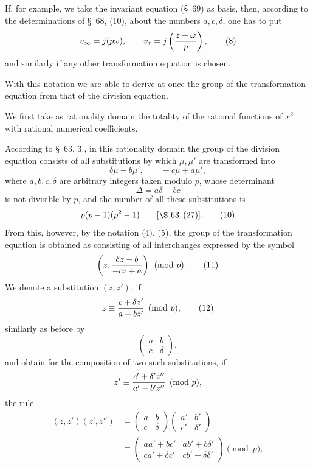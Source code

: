 \documentclass[11pt]{article}
\begin{document}
If, for example, we take the invariant equation (\S~69) as basis, then, according to the determinations of \S~68, (10), about the numbers $a,c,\delta$, one has to put
\begin{equation}
 v_\infty=j(p\omega),
 \qquad
 v_z=j\left({z+\omega\over p}\right),
\tag{8}
\end{equation}
and similarly if any other transformation equation is chosen.

With this notation we are able to derive at once the group of the transformation equation from that of the division equation.

We first take as rationality domain the totality of the rational functions of $x^2$ with rational numerical coefficients.

According to \S~63, 3., in this rationality domain the group of the division equation consists of all substitutions by which $\mu,\mu'$ are transformed into
\[
 \delta\mu-b\mu',
 \qquad
 -c\mu+a\mu',
\]
where $a,b,c,\delta$ are arbitrary integers taken modulo $p$, whose determinant
\begin{equation}
 \Delta=a\delta-bc
\tag{9}
\end{equation}
is not divisible by $p$, and the number of all these substitutions is
\begin{equation}
 p(p-1)(p^2-1) \qquad [\S~63,(27)].
\tag{10}
\end{equation}
From this, however, by the notation (4), (5), the group of the transformation equation is obtained as consisting of all interchanges expressed by the symbol
\begin{equation}
 \left(z,{\delta z-b\over -cz+a}\right)\pmod p.
\tag{11}
\end{equation}
We denote a substitution $(z,z')$, if
\begin{equation}
 z\equiv {c+\delta z'\over a+bz'}\pmod p,
\tag{12}
\end{equation}
similarly as before by
\begin{equation}
\begin{pmatrix}a&b\\ c&\delta\end{pmatrix},
\tag{13}
\end{equation}
and obtain for the composition of two such substitutions, if
\[
 z'\equiv {c'+\delta' z''\over a'+b'z''}\pmod p,
\]
the rule
\begin{equation}
\begin{aligned}
(z,z')(z',z'')&=\begin{pmatrix}a&b\\ c&\delta\end{pmatrix}\begin{pmatrix}a'&b'\\ c'&\delta'\end{pmatrix}\\
&\equiv\begin{pmatrix}aa'+bc'&ab'+b\delta'\\ ca'+\delta c'&cb'+\delta\delta'\end{pmatrix}\pmod p,
\end{aligned}
\tag{14}
\end{equation}
\end{document}
